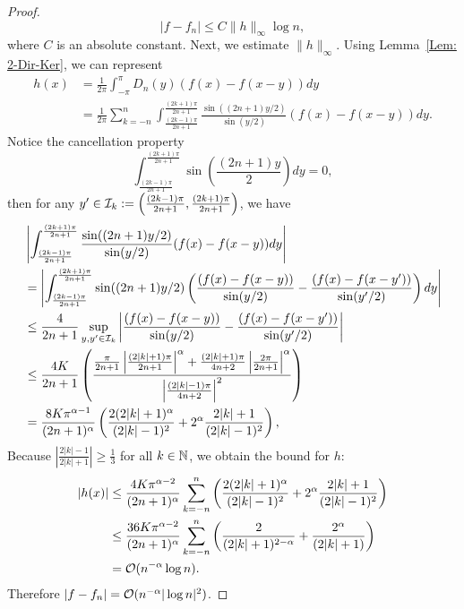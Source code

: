 \begin{proof}
    \begin{equation}
        |f - f_n| \le C \|h\|_{\infty} \log n,
    \end{equation}
    where $C$ is an absolute constant. Next, we estimate $\|h\|_{\infty}$. Using Lemma~\ref{Lem: 2-Dir-Ker}, we can represent
    \begin{equation}
    \begin{aligned}
        h(x) &= \frac{1}{2\pi} \int_{-\pi}^{\pi} D_n(y) (f(x) - f(x - y) ) dy \\
        &= \frac{1}{2\pi} \sum_{k=-n}^{n} \int_{\frac{(2k-1)\pi}{2n+1}}^{\frac{(2k+1)\pi}{2n+1}} \frac{\sin((2n+1) y/2)}{\sin(y/2)}  (f(x) - f(x - y) ) dy.
    \end{aligned}
    \end{equation}
    Notice the cancellation property
    \begin{equation}
         \int_{\frac{(2k-1)\pi}{2n+1}}^{\frac{(2k+1)\pi}{2n+1}} \sin\left(\frac{(2n+1) y}{2}\right) dy = 0,
    \end{equation}
    then for any $y'\in \mathcal I_k:= \left(\frac{(2k-1)\pi}{2n+1}, \frac{(2k+1)\pi}{2n+1}\right)$, we have 
    \begin{equation}
    \label{EQ: CANCELLATION F}
    \begin{aligned}
    &\left| \int_{\frac{(2k-1)\pi}{2n+1}}^{\frac{(2k+1)\pi}{2n+1}} \frac{\sin((2n+1) y/2)}{\sin(y/2)}  (f(x) - f(x - y) ) dy \right| \\
    &= \left| \int_{\frac{(2k-1)\pi}{2n+1}}^{\frac{(2k+1)\pi}{2n+1}} \sin((2n+1) y/2)  \left( \frac{(f(x) - f(x - y) )}{\sin(y/2)} - \frac{(f(x) - f(x - y') )}{\sin(y'/2)} \right) dy \right| \\
    &\le \frac{4}{2n+1}\sup_{y,y'\in \mathcal I_k} \left| \frac{(f(x) - f(x - y) )}{\sin(y/2)} - \frac{(f(x) - f(x - y') )}{\sin(y'/2)} \right|\\
    &\le \frac{4K}{2n+1}\left(\frac{\frac{\pi}{2n+1}\left|\frac{(2|k|+1)\pi}{2n+1}\right|^{\alpha}+ \frac{(2|k|+1)\pi}{4n+2}\left|\frac{2\pi}{2n+1}\right|^{\alpha}}{\left|\frac{(2|k|-1)\pi}{4n+2}\right|^2}\right)\\
    &=\frac{8K\pi^{\alpha-1}}{(2n+1)^{\alpha}} \left( \frac{2(2|k|+1)^{\alpha}}{(2|k|-1)^2}+ 2^{\alpha}\frac{2|k|+1}{(2|k|-1)^2} \right),
    \end{aligned}
    \end{equation}
    Because $\left|\frac{2|k|-1}{2|k|+1}\right|\ge \frac{1}{3}$ for all $k\in\mathbb N$, we obtain the bound for $h$:
    \begin{equation}
    \begin{aligned}
        |h(x)| &\le  \frac{4K\pi^{\alpha-2}}{(2n+1)^{\alpha}} \sum_{k=-n}^{n}  \left( \frac{2(2|k|+1)^{\alpha}}{(2|k|-1)^2}+ 2^{\alpha}\frac{2|k|+1}{(2|k|-1)^2} \right)\\&
        \le  \frac{36K\pi^{\alpha-2}}{(2n+1)^{\alpha}} \sum_{k=-n}^{n}  \left( \frac{2}{(2|k|+1)^{2-\alpha}}+ \frac{ 2^{\alpha}}{(2|k|+1)} \right)\\
        &= \mathcal O(n^{-\alpha} \log n).
    \end{aligned}
    \end{equation}
    Therefore $|f - f_n|=\mathcal O( n^{-\alpha} |\log n|^2 )$.
\end{proof}
